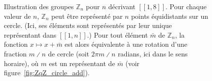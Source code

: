 \begin{figure}
    \centering
    \def\maxN{8}
    \caption{Illustration des groupes $\mathbb{Z}_n$ pour $n$ décrivant $[\![1, \maxN]\!]$. 
        Pour chaque valeur de $n$, $\mathbb{Z}_n$ peut être représenté par $n$ points équidistants sur un cercle. 
        (Ici, ses éléments sont représentés par leur unique représentant dans $[\![1, n]\!]$.) 
        Pour tout élément $\bar{m}$ de $\mathbb{Z}_n$, la fonction $x \mapsto x + \bar{m}$ est alors équivalente à une rotation d'une fraction $m \divslash n$ de cercle (soit $2 \pi m \divslash n$ radians, ici dans le sens horaire), où $m$ est un représentant de $\bar{m}$ (voir figure~\ref{fig:ZqZ_circle_add}).
        }
    \label{fig:ZqZ_circle}
\end{figure}

